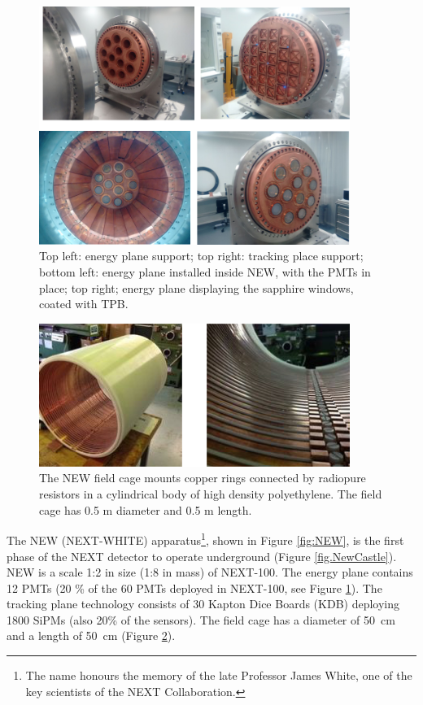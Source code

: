 \begin{figure}
\centering
\includegraphics[width=0.9\textwidth]{img2/EP.png}
\caption{\small Top left: energy plane support; top right: tracking place
support; bottom left: energy plane installed inside NEW, with the PMTs in place; 
top right; energy plane displaying the sapphire windows, coated with TPB.} \label{fig.EP}
\end{figure} 


\begin{figure}
\centering
\includegraphics[width=0.9\textwidth]{img2/FieldCage.png}
\caption{\small The NEW field cage mounts copper rings connected by radiopure resistors in a cylindrical body of high density polyethylene. The field cage has 0.5 m diameter and 0.5 m length.} \label{fig.FC}
\end{figure}


The NEW (NEXT-WHITE) apparatus\footnote{The name honours the memory of the late Professor James White, one of the key scientists of the NEXT Collaboration.}, shown in Figure \ref{fig:NEW}, is the first phase of the NEXT detector to operate underground (Figure \ref{fig.NewCastle}). NEW 
is a scale 1:2 in size (1:8 in mass) of NEXT-100. The energy plane contains 12 PMTs (20 \% of the 60 PMTs deployed in NEXT-100, see Figure \ref{fig.EP}). The tracking plane technology consists of 30 Kapton Dice Boards (KDB) deploying 1800 SiPMs (also 20\% of the sensors). The field cage has a diameter of 50~cm and a length of 50~cm (Figure \ref{fig.FC}). 

